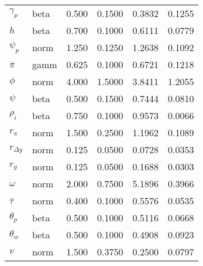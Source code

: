 \begin{center}
\begin{longtable}{llcccc}
${\gamma_p}$ & beta &   0.500 & 0.1500 &   0.3832 &  0.1255 \\ 
${h}$ & beta &   0.700 & 0.1000 &   0.6111 &  0.0779 \\ 
${\psi_p}$ & norm &   1.250 & 0.1250 &   1.2638 &  0.1092 \\ 
${\bar{\pi}}$ & gamm &   0.625 & 0.1000 &   0.6721 &  0.1218 \\ 
${\phi}$ & norm &   4.000 & 1.5000 &   3.8411 &  1.2055 \\ 
${\psi}$ & beta &   0.500 & 0.1500 &   0.7444 &  0.0810 \\ 
${\rho_{i}}$ & beta &   0.750 & 0.1000 &   0.9573 &  0.0066 \\ 
${r_{\pi}}$ & norm &   1.500 & 0.2500 &   1.1962 &  0.1089 \\ 
${r_{\Delta y}}$ & norm &   0.125 & 0.0500 &   0.0728 &  0.0353 \\ 
${r_{y}}$ & norm &   0.125 & 0.0500 &   0.1688 &  0.0303 \\ 
${\omega}$ & norm &   2.000 & 0.7500 &   5.1896 &  0.3966 \\ 
${\bar{\tau}}$ & norm &   0.400 & 0.1000 &   0.5576 &  0.0535 \\ 
${\theta_p}$ & beta &   0.500 & 0.1000 &   0.5116 &  0.0668 \\ 
${\theta_w}$ & beta &   0.500 & 0.1000 &   0.4908 &  0.0923 \\ 
${v}$ & norm &   1.500 & 0.3750 &   0.2500 &  0.0797 \\ 
\end{longtable}
 \end{center}
